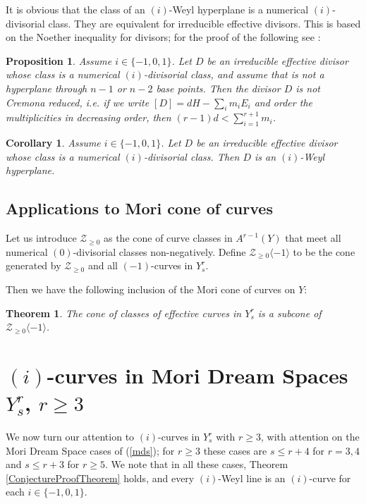 \documentclass[12pt]{article}
\newtheorem{theorem}[equation]{Theorem}
\newtheorem{corollary}[equation]{Corollary}
\newtheorem{proposition}[equation]{Proposition}
\numberwithin{equation}{section}
\numberwithin{subeq}{equation}
\begin{document}
It is obvious that the class of an $(i)$-Weyl hyperplane
is a numerical $(i)$-divisorial class.
They are equivalent for irreducible effective divisors.
This is based on the Noether inequality for divisors;
for the proof of the following see \cite[Theorem 0.4]{DP}:

\begin{proposition} 
Assume $i\in \{-1,0,1\}$.
Let $D$ be an irreducible effective divisor whose class is a numerical $(i)$-divisorial class,
and assume that is not a hyperplane through $n-1$ or $n-2$ base points.
Then the divisor $D$ is not Cremona reduced, i.e.
if we write $[D] = dH-\sum_i m_i E_i$ and order the multiplicities in decreasing order,
then $(r-1)d < \sum_{i=1}^{r+1} m_i$.
\end{proposition}

\begin{corollary}\label{div}
Assume $i\in \{-1,0,1\}$.
Let $D$ be an irreducible effective divisor
whose class is a numerical $(i)$-divisorial class.
Then $D$ is an $(i)$-Weyl hyperplane.
\end{corollary}




\subsection{Applications to Mori cone of curves}\label{appMoricone}


Let us introduce
$\mathcal{Z}_{\geq 0}$
as the cone of curve classes in $A^{r-1}(Y)$ 
that meet all numerical $(0)$-divisorial classes non-negatively.
Define $\mathcal{Z}_{\geq 0}\langle -1 \rangle$
to be the cone generated by $\mathcal{Z}_{\geq 0}$ and all $(-1)$-curves in $Y^r_s$.

Then we have the following inclusion of the Mori cone of curves on $Y$:

\begin{theorem}\label{cor}
The cone of classes of effective curves in $Y^r_s$ is a subcone of 
$\mathcal{Z}_{\geq 0}\langle -1 \rangle$.

\end{theorem}

\section{$(i)$-curves in Mori Dream Spaces $Y^r_s$, $r\geq 3$}\label{-1curvesMDS}
We now turn our attention to $(i)$-curves in $Y^r_s$ with $r\geq 3$,
with attention on the Mori Dream Space cases of (\ref{mds});
for $r \geq 3$ these cases are $s \leq r+4$ for $r = 3,4$ and $s \leq r+3$ for $r\geq 5$.
We note that in all these cases, Theorem \ref{ConjectureProofTheorem} holds,
and every $(i)$-Weyl line is an $(i)$-curve for each $i \in \{-1,0,1\}$.
\end{document}

